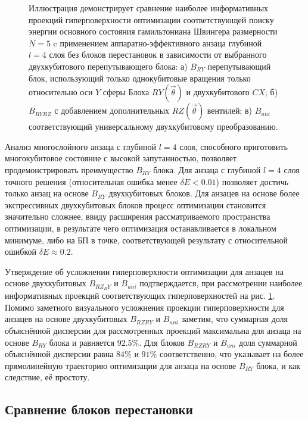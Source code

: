 \documentclass[14pt]{extarticle}
\begin{document}
\begin{figure}[H]
\begin{center}
\begin{minipage}[H]{0.49\linewidth}
\end{minipage}
\end{center}
\caption{Иллюстрация демонстрирует сравнение наиболее информативных проекций гиперповерхности оптимизации соответствующей поиску энергии основного состояния гамильтониана Швингера размерности $N = 5$ c применением аппаратно-эффективного анзаца глубиной $l = 4$ слоя без блоков перестановок в зависимости от выбранного двухкубитового перепутывающего блока: а) $B_{RY}$ перепутывающий блок, использующий только однокубитовые вращения только относительно оси $Y$ сферы Блоха $RY (\vec \theta)$ и двухкубитового $CX$; б) $B_{RY RZ}$ с добавлением дополнительных $RZ (\vec \theta)$ вентилей; в) $B_{uni}$ соответствующий универсальному двухкубитовому преобразованию.}\label{fig:proj_comp_block_unit}
\end{figure}


\qquad Анализ многослойного анзаца с глубиной $l = 4$ слоя, способного приготовить многокубитовое состояние с высокой запутанностью, позволяет продемонстрировать преимущество $B_{RY}$ блока. Для анзаца с глубиной $l = 4$ слоя точного решения (относительная ошибка менее $\delta E < 0.01$) позволяет достичь только анзац на основе $B_{RY}$ двухкубитовых блоков. Для анзацев на основе более экспрессивных двухкубитовых блоков процесс оптимизации становится значительно сложнее, ввиду расширения рассматриваемого пространства оптимизации, в результате чего оптимизация останавливается в локальном минимуме, либо на БП в точке, соответствующей результату с относительной ошибкой $\delta E \approx 0.2$. 

\qquad Утверждение об усложнении гиперповерхности оптимизации для анзацев на основе двухкубитовых $B_{RZ_RY}$ и $B_{uni}$ подтверждается, при рассмотрении наиболее информативных проекций соответствующих гиперповерхностей на рис. \ref{fig:proj_comp_block_unit}. Помимо заметного визуального усложнения проекции гиперповерхности для анзацев на основе двухкубитовых $B_{RZ RY}$ и $B_{uni}$ заметим, что суммарная доля объяснённой дисперсии для рассмотренных проекций максимальна для анзаца на основе $B_{RY}$ блока и равняется $92.5\%$. Для блоков $B_{RZ RY}$ и $B_{uni}$ доля суммарной объяснённой дисперсии равна $84\%$ и $91\%$ соответственно, что указывает на более прямолинейную траекторию оптимизации для анзаца на основе $B_{RY}$ блока, и как следствие, её простоту.


\subsection{Сравнение блоков перестановки}
\end{document}

